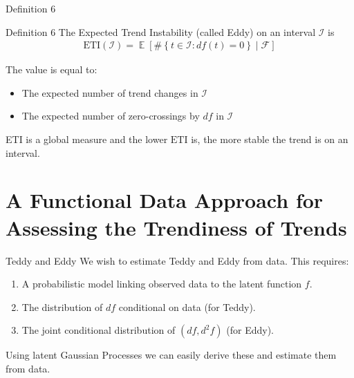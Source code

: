 \documentclass[ignorenonframetext,xcolor=pdflatex,table,dvipsnames,serif]{beamer}
\DeclareMathOperator{\E}{\mathbb{E}}
\begin{document}
\begin{frame}{Definition 6}
\begin{alertblock}{Definition 6}
  The \alert{Expected Trend Instability} (called Eddy) on an interval $\mathcal{I}$ is
  \begin{align*}
    \mathrm{ETI}(\mathcal{I}) = \E[\#\left\{t \in \mathcal{I} : df(t) = 0\right\} \mid \mathcal{F}]
  \end{align*}
\end{alertblock}    
The value is equal to:
\begin{itemize}
  \item{The expected number of trend changes in $\mathcal{I}$}
  \item{The expected number of zero-crossings by $df$ in $\mathcal{I}$}
\end{itemize}
ETI is a global measure and the lower $\mathrm{ETI}$ is, the more stable the trend is on an interval.
\end{frame}

\section{A Functional Data Approach for Assessing the Trendiness of Trends}

\begin{frame}{Teddy and Eddy}
We wish to estimate Teddy and Eddy from data. This requires:
\begin{enumerate}
  \item{A probabilistic model linking observed data to the latent function $f$.}
  \item{The distribution of $df$ conditional on data (for Teddy).}
  \item{The joint conditional distribution of $(df, d^2\!f)$ (for Eddy).}
\end{enumerate}

\vspace{0.8cm}

Using latent \alert{Gaussian Processes} we can easily derive these and estimate them from data.

\end{frame}
\end{document}
